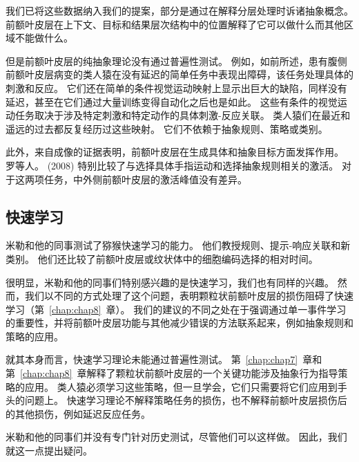 我们已将这些数据纳入我们的提案，部分是通过在解释分层处理时诉诸抽象概念。
前额叶皮层在上下文、目标和结果层次结构中的位置解释了它可以做什么而其他区域不能做什么。
\par


但是前额叶皮层的纯抽象理论没有通过普遍性测试。
例如，如前所述，患有腹侧前额叶皮层病变的类人猿在没有延迟的简单任务中表现出障碍\cite{iversen1970perseverative}，该任务处理具体的刺激和反应。
它们还在简单的条件视觉运动映射上显示出巨大的缺陷，同样没有延迟，甚至在它们通过大量训练变得自动化之后也是如此\cite{bussey2001role}。
这些有条件的视觉运动任务取决于涉及特定刺激和特定动作的具体刺激-反应关联。
类人猿们在最近和遥远的过去都反复经历过这些映射。 它们不依赖于抽象规则、策略或类别。
\par


此外，来自成像的证据表明，前额叶皮层在生成具体和抽象目标方面发挥作用。 
罗等人。 (2008) 特别比较了与选择具体手指运动和选择抽象规则相关的激活。 对于这两项任务，中外侧前额叶皮层的激活峰值没有差异。



\subsection{快速学习}

米勒和他的同事测试了猕猴快速学习的能力。
他们教授规则\cite{miller2007rules}、提示-响应关联\cite{cromer2011rapid}和新类别\cite{antzoulatos2011differences}。
他们还比较了前额叶皮层或纹状体中的细胞编码选择的相对时间\cite{miller2007rules,antzoulatos2011differences}。
\par


很明显，米勒和他的同事们特别感兴趣的是快速学习，我们也有同样的兴趣。
然而，我们以不同的方式处理了这个问题，表明颗粒状前额叶皮层的损伤阻碍了快速学习（第~\ref{chap:chap8}~章）。
我们的建议的不同之处在于强调通过单一事件学习的重要性，并将前额叶皮层功能与其他减少错误的方法联系起来，例如抽象规则和策略的应用。
\par


就其本身而言，快速学习理论未能通过普遍性测试。
第~\ref{chap:chap7}~章和第~\ref{chap:chap8}~章解释了颗粒状前额叶皮层的一个关键功能涉及抽象行为指导策略的应用。
类人猿必须学习这些策略，但一旦学会，它们只需要将它们应用到手头的问题上。
快速学习理论不解释策略任务的损伤，也不解释前额叶皮层损伤后的其他损伤，例如延迟反应任务。
\par


米勒和他的同事们并没有专门针对历史测试，尽管他们可以这样做。
因此，我们就这一点提出疑问。




